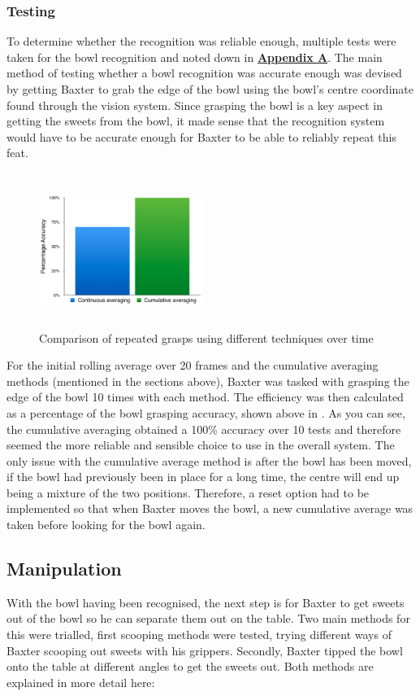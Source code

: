 \subsubsection{Testing}
To determine whether the recognition was reliable enough, multiple tests were taken for the bowl recognition and noted down in \hyperref[chap:AppendixA]{\textbf{Appendix A}}. The main method of testing whether a bowl recognition was accurate enough was devised by getting Baxter to grab the edge of the bowl using the bowl's centre coordinate found through the vision system. Since grasping the bowl is a key aspect in getting the sweets from the bowl, it made sense that the recognition system would have to be accurate enough for Baxter to be able to reliably repeat this feat.
\captionsetup[figure]{justification=centering}
\begin{figure}[H]
        \centering 
        \includegraphics[width=0.475\textwidth, height=5cm]{bowlrecognition.png}
        \caption{Comparison of repeated grasps using different techniques over time}
        \label{fig:bowlRecognition}
\end{figure}
\vspace{-0.2cm}For the initial rolling average over 20 frames and the cumulative averaging methods (mentioned in the sections above), Baxter was tasked with grasping the edge of the bowl 10 times with each method. The efficiency was then calculated as a percentage of the bowl grasping accuracy, shown above in \textbf{}. As you can see, the cumulative averaging obtained a 100\% accuracy over 10 tests and therefore seemed the more reliable and sensible choice to use in the overall system. The only issue with the cumulative average method is after the bowl has been moved, if the bowl had previously been in place for a long time, the centre will end up being a mixture of the two positions. Therefore, a reset option had to be implemented so that when Baxter moves the bowl, a new cumulative average was taken before looking for the bowl again.
\subsection{Manipulation}
With the bowl having been recognised, the next step is for Baxter to get sweets out of the bowl so he can separate them out on the table. Two main methods for this were trialled, first scooping methods were tested, trying different ways of Baxter scooping out sweets with his grippers. Secondly, Baxter tipped the bowl onto the table at different angles to get the sweets out. Both methods are explained in more detail here:
